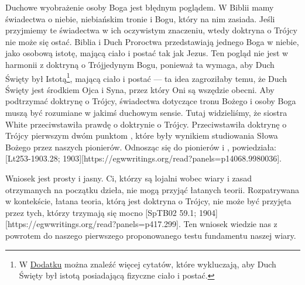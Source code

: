 Duchowe wyobrażenie osoby Boga jest błędnym poglądem. W Biblii mamy świadectwa o niebie, niebiańskim tronie i Bogu, który na nim zasiada. Jeśli przyjmiemy te świadectwa w ich oczywistym znaczeniu, wtedy doktryna o Trójcy nie może się ostać. Biblia i Duch Proroctwa przedstawiają jednego Boga w niebie, jako osobową istotę, mającą ciało i postać tak jak Jezus. Ten pogląd nie jest w harmonii z doktryną o Trójjedynym Bogu, ponieważ ta wymaga, aby Duch Święty był Istotą\footnote{W \hyperref[appendix:unauthenticated-reports]{Dodatku} można znaleźć więcej cytatów, które wykluczają, aby Duch Święty był istotą posiadającą fizyczne ciało i postać.}, mającą ciało i postać — ta idea zagroziłaby temu, że Duch Święty jest środkiem Ojca i Syna, przez który Oni są wszędzie obecni. Aby podtrzymać doktrynę o Trójcy, świadectwa dotyczące tronu Bożego i osoby Boga muszą być rozumiane w jakimś duchowym sensie. Tutaj widzieliśmy, że siostra White przeciwstawiła prawdę o  doktrynie o Trójcy. Przeciwstawiła doktrynę o Trójcy pierwszym dwóm punktom , które były wynikiem studiowania Słowa Bożego przez naszych pionierów. Odnosząc się do pionierów i , powiedziała: [Lt253-1903.28; 1903][https://egwwritings.org/read?panels=p14068.9980036].

Wniosek jest prosty i jasny. Ci, którzy są lojalni wobec wiary i zasad otrzymanych na początku dzieła, nie mogą przyjąć łatanych teorii. Rozpatrywana w kontekście, łatana teoria, którą jest doktryna o Trójcy, nie może być przyjęta przez tych, którzy trzymają się mocno [SpTB02 59.1; 1904][https://egwwritings.org/read?panels=p417.299]. Ten wniosek wiedzie nas z powrotem do naszego pierwszego proponowanego testu fundamentu naszej wiary.


